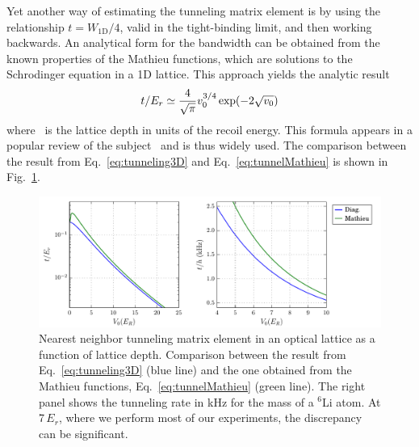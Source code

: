 Yet another way of estimating the tunneling matrix element \cite{Bloch2008} is
by using the relationship $t=W_{\text{1D}}/4$, valid in the tight-binding
limit, and then working backwards.  An analytical form for the bandwidth can be
obtained from the known properties of the Mathieu functions, which are
solutions to the Schrodinger equation in a 1D lattice.  This approach yields
the analytic result 
\begin{equation}
 t/E_{r} \simeq \frac{4}{\sqrt{\pi}} v_{0}^{3/4} \exp(-2\sqrt{v_{0}}) 
\label{eq:tunnelMathieu}
\end{equation} 
where \vvo\ is the lattice depth in units of the recoil energy. This formula
appears in a popular review of the subject~\cite{Bloch2008} and is thus widely
used.  The comparison between the result from Eq.~\ref{eq:tunneling3D} and
Eq.~\ref{eq:tunnelMathieu} is shown in Fig.~\ref{fig:tMathieu}. 
\begin{figure}
\centering
\includegraphics[width=\textwidth]{../figures/BandStructure_figures/tunneling_V0_Mathieu.pdf}
\caption[Nearest neighbor tunneling matrix element]{\small Nearest neighbor
tunneling matrix element in an optical lattice as a function of lattice depth.
Comparison between the result from Eq.~\ref{eq:tunneling3D} (blue line) and the
one obtained from the Mathieu functions, Eq.~\ref{eq:tunnelMathieu} (green
line).  The right panel shows the tunneling rate in kHz for the mass of a
$^{6}$Li atom.  At 7\,$E_{r}$, where we perform most of our experiments, the
discrepancy can be significant.  }
\label{fig:tMathieu}
\end{figure}



